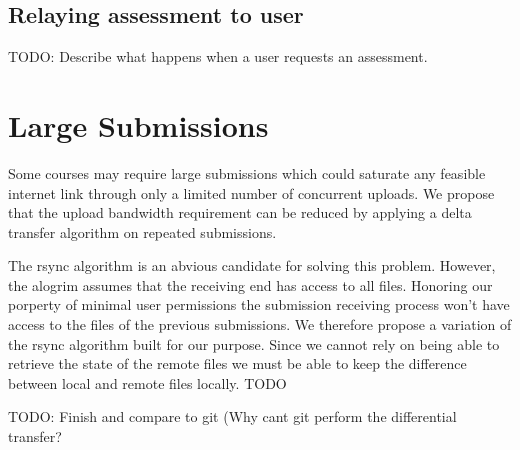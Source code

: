 \subsection{Relaying assessment to user}



TODO: Describe what happens when a user requests an assessment.







\section{Large Submissions}
Some courses may require large submissions which could saturate
any feasible internet link through only a limited number of concurrent
uploads. We propose that the upload bandwidth requirement can be
reduced by applying a delta transfer algorithm on repeated
submissions.

The rsync algorithm is an abvious candidate for solving this
problem. However, the alogrim assumes that the receiving end has
access to all files. Honoring our porperty of minimal user permissions
the submission receiving process won't have access to the files of the
previous submissions. We therefore propose a variation of the rsync
algorithm built for our purpose. Since we cannot rely on being able to
retrieve the state of the remote files we must be able to keep the
difference between local and remote files locally. TODO

TODO: Finish and compare to git (Why cant git perform the differential
transfer?



